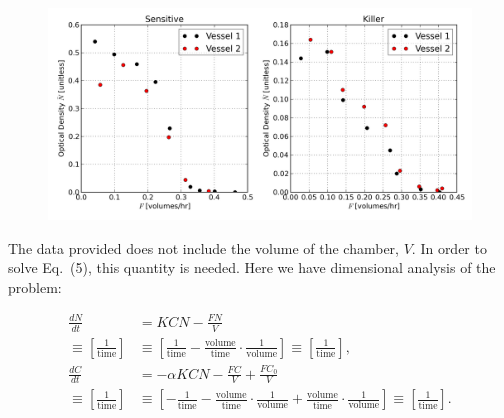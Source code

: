 \begin{figure}[H]
  \centering
    \includegraphics[width=1.0\textwidth]{images/data.png}
\end{figure}

The data provided does not include the volume of the chamber, $V$.  In order to solve Eq.\ (5), this quantity is needed.  Here we have dimensional analysis of the problem:

\begin{align*}
  \frac{dN}{dt} &= KCN - \frac{FN}{V} \\
  \equiv \left[ \frac{1}{\text{time}} \right] &\equiv \left[ \frac{1}{\text{time}} - \frac{\text{volume}}{\text{time}} \cdot \frac{1}{\text{volume}} \right] \equiv \left[ \frac{1}{\text{time}} \right], \\
  \frac{dC}{dt} &= -\alpha KCN - \frac{FC}{V} + \frac{FC_0}{V} \\
  \equiv \left[ \frac{1}{\text{time}} \right] &\equiv \left[ -\frac{1}{\text{time}} - \frac{\text{volume}}{\text{time}} \cdot \frac{1}{\text{volume}} + \frac{\text{volume}}{\text{time}} \cdot \frac{1}{\text{volume}} \right] \equiv \left[ \frac{1}{\text{time}} \right].
\end{align*}

